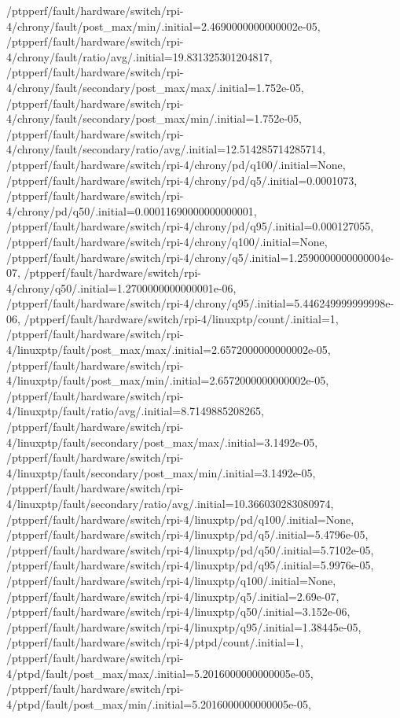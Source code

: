{    /ptpperf/fault/hardware/switch/rpi-4/chrony/fault/post_max/min/.initial=2.4690000000000002e-05,
    /ptpperf/fault/hardware/switch/rpi-4/chrony/fault/ratio/avg/.initial=19.831325301204817,
    /ptpperf/fault/hardware/switch/rpi-4/chrony/fault/secondary/post_max/max/.initial=1.752e-05,
    /ptpperf/fault/hardware/switch/rpi-4/chrony/fault/secondary/post_max/min/.initial=1.752e-05,
    /ptpperf/fault/hardware/switch/rpi-4/chrony/fault/secondary/ratio/avg/.initial=12.514285714285714,
    /ptpperf/fault/hardware/switch/rpi-4/chrony/pd/q100/.initial=None,
    /ptpperf/fault/hardware/switch/rpi-4/chrony/pd/q5/.initial=0.0001073,
    /ptpperf/fault/hardware/switch/rpi-4/chrony/pd/q50/.initial=0.00011690000000000001,
    /ptpperf/fault/hardware/switch/rpi-4/chrony/pd/q95/.initial=0.000127055,
    /ptpperf/fault/hardware/switch/rpi-4/chrony/q100/.initial=None,
    /ptpperf/fault/hardware/switch/rpi-4/chrony/q5/.initial=1.2590000000000004e-07,
    /ptpperf/fault/hardware/switch/rpi-4/chrony/q50/.initial=1.2700000000000001e-06,
    /ptpperf/fault/hardware/switch/rpi-4/chrony/q95/.initial=5.446249999999998e-06,
    /ptpperf/fault/hardware/switch/rpi-4/linuxptp/count/.initial=1,
    /ptpperf/fault/hardware/switch/rpi-4/linuxptp/fault/post_max/max/.initial=2.6572000000000002e-05,
    /ptpperf/fault/hardware/switch/rpi-4/linuxptp/fault/post_max/min/.initial=2.6572000000000002e-05,
    /ptpperf/fault/hardware/switch/rpi-4/linuxptp/fault/ratio/avg/.initial=8.7149885208265,
    /ptpperf/fault/hardware/switch/rpi-4/linuxptp/fault/secondary/post_max/max/.initial=3.1492e-05,
    /ptpperf/fault/hardware/switch/rpi-4/linuxptp/fault/secondary/post_max/min/.initial=3.1492e-05,
    /ptpperf/fault/hardware/switch/rpi-4/linuxptp/fault/secondary/ratio/avg/.initial=10.366030283080974,
    /ptpperf/fault/hardware/switch/rpi-4/linuxptp/pd/q100/.initial=None,
    /ptpperf/fault/hardware/switch/rpi-4/linuxptp/pd/q5/.initial=5.4796e-05,
    /ptpperf/fault/hardware/switch/rpi-4/linuxptp/pd/q50/.initial=5.7102e-05,
    /ptpperf/fault/hardware/switch/rpi-4/linuxptp/pd/q95/.initial=5.9976e-05,
    /ptpperf/fault/hardware/switch/rpi-4/linuxptp/q100/.initial=None,
    /ptpperf/fault/hardware/switch/rpi-4/linuxptp/q5/.initial=2.69e-07,
    /ptpperf/fault/hardware/switch/rpi-4/linuxptp/q50/.initial=3.152e-06,
    /ptpperf/fault/hardware/switch/rpi-4/linuxptp/q95/.initial=1.38445e-05,
    /ptpperf/fault/hardware/switch/rpi-4/ptpd/count/.initial=1,
    /ptpperf/fault/hardware/switch/rpi-4/ptpd/fault/post_max/max/.initial=5.2016000000000005e-05,
    /ptpperf/fault/hardware/switch/rpi-4/ptpd/fault/post_max/min/.initial=5.2016000000000005e-05,
}
